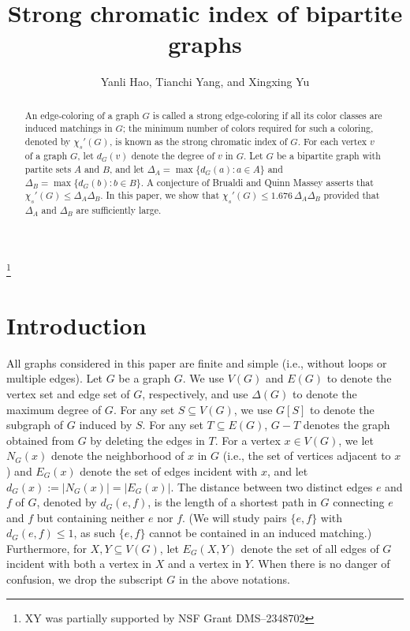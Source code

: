 \documentclass[11pt]{amsart}
\begin{document}
\title{Strong chromatic index of bipartite graphs}
\date{}

\author{Yanli Hao, Tianchi Yang, and Xingxing Yu}
\address{School of Mathematics, Georgia Institute of Technology, Atlanta, GA 30332}
\footnote{XY was partially supported by NSF Grant DMS--2348702}





\begin{abstract}
An edge-coloring of a graph $G$ is called a strong edge-coloring if all its color classes are induced matchings in $G$;  
the minimum number of colors required for such a coloring, denoted by $\chi_{s}'(G)$, is known as the strong chromatic index of $G$. For each vertex $v$ of a graph $G$, let $d_G(v)$ denote the degree of $v$ in $G$. Let $G$ be a bipartite graph with partite sets $A$ and $B$, and let $\Delta_A=\max\{d_G(a): a\in A\}$ and $\Delta_B=\max\{d_G(b): b\in B\}$. A conjecture of Brualdi and Quinn Massey asserts that
\( \chi_s'(G) \le \Delta_A \Delta_B\).  
In this paper, we show that  \(\chi_s'(G) \le 1.676\, \Delta_A \Delta_B\) provided that $\Delta_A$ and $\Delta_B$ are sufficiently large. 
\end{abstract}


\maketitle


\section{Introduction}




All graphs considered in this paper are finite and simple (i.e., without loops or multiple edges). Let $G$ be a graph $G$. We use $V(G)$ and $E(G)$ to denote the vertex set and edge set of $G$, respectively, and use $\Delta(G)$ to denote the maximum degree of $G$. For any set $S\subseteq V(G)$, we use $G[S]$ to denote the subgraph of $G$ induced by $S$. For any set $T\subseteq E(G)$, $G-T$ denotes the graph obtained from $G$ by deleting the edges in $T$.  For a vertex $x\in V(G)$, we let $N_G(x)$ denote the neighborhood of $x$ in $G$ (i.e., the set of vertices adjacent to $x$) and $E_G(x)$ denote the set of edges incident with $x$, and let $d_G(x):=|N_G(x)|=|E_G(x)|$.  
The distance between two distinct edges $e$ and $f$ of $G$, denoted by $d_G(e, f)$, is the length of a shortest path in $G$ connecting $e$ and $f$ but containing neither $e$ nor $f$. (We will study pairs $\{e,f\}$ with $d_G(e,f)\le 1$, as such $\{e,f\}$ cannot be contained in an induced matching.)  Furthermore, for $X,Y\subseteq V(G)$, let $E_G(X,Y)$ denote the set of all edges of $G$ incident with both a vertex in $X$ and a vertex in $Y$. When there is no danger of confusion, we drop the subscript $G$ in the above notations. 
\end{document}

